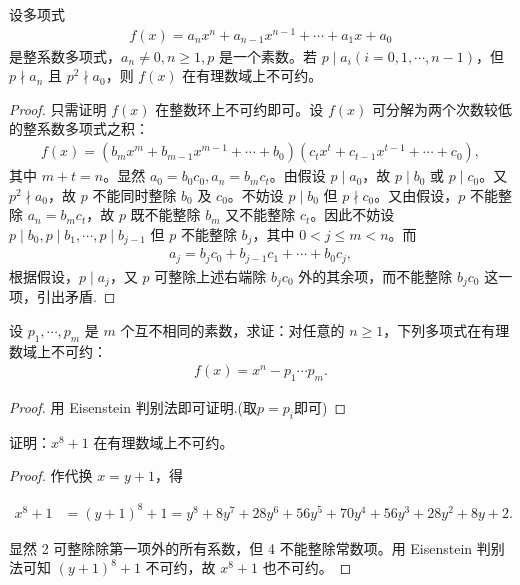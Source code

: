 \documentclass[../../main.tex]{subfiles}%
\begin{document}
\begin{theorem}[Eisenstein判别法]\label{theorem:Eisenstein判别法}
设多项式
\begin{align*}
f(x) = a_n x^n + a_{n-1} x^{n-1} + \cdots + a_1 x + a_0
\end{align*}
是整系数多项式，$a_n \neq 0, n \geqslant  1, p$ 是一个素数。若 $p \mid a_i (i = 0, 1, \cdots, n-1)$，但 $p \nmid a_n$ 且 $p^2 \nmid a_0$，则 $f(x)$ 在有理数域上不可约。    
\end{theorem}
\begin{proof}
只需证明 $f(x)$ 在整数环上不可约即可。设 $f(x)$ 可分解为两个次数较低的整系数多项式之积：
\begin{align*}
f(x) = (b_m x^m + b_{m-1} x^{m-1} + \cdots + b_0)(c_t x^t + c_{t-1} x^{t-1} + \cdots + c_0),
\end{align*}
其中 $m + t = n$。显然 $a_0 = b_0 c_0, a_n = b_m c_t$。由假设 $p \mid a_0$，故 $p \mid b_0$ 或 $p \mid c_0$。又 $p^2 \nmid a_0$，故 $p$ 不能同时整除 $b_0$ 及 $c_0$。不妨设 $p \mid b_0$ 但 $p \nmid c_0$。又由假设，$p$ 不能整除 $a_n = b_m c_t$，故 $p$ 既不能整除 $b_m$ 又不能整除 $c_t$。因此不妨设 $p \mid b_0, p \mid b_1, \cdots, p \mid b_{j-1}$ 但 $p$ 不能整除 $b_j$，其中 $0 < j \leqslant  m < n$。而
\begin{align*}
a_j = b_j c_0 + b_{j-1} c_1 + \cdots + b_0 c_j,
\end{align*}
根据假设，$p \mid a_j$，又 $p$ 可整除上述右端除 $b_j c_0$ 外的其余项，而不能整除 $b_j c_0$ 这一项，引出矛盾.
\end{proof}

\begin{example}
设 $p_1, \cdots, p_m$ 是 $m$ 个互不相同的素数，求证：对任意的 $n \geqslant  1$，下列多项式在有理数域上不可约：
\begin{align*}
f(x) = x^n - p_1 \cdots p_m.
\end{align*} 
\end{example}
\begin{proof}
用 Eisenstein 判别法即可证明.(取$p=p_i$即可)
\end{proof}

\begin{example}
证明：$x^8 + 1$ 在有理数域上不可约。
\end{example}
\begin{proof}
作代换 $x = y + 1$，得

\begin{align*}
x^8 + 1 &= (y + 1)^8 + 1 = y^8 + 8y^7 + 28y^6 + 56y^5 + 70y^4 + 56y^3 + 28y^2 + 8y + 2.
\end{align*}

显然 2 可整除除第一项外的所有系数，但 4 不能整除常数项。用 Eisenstein 判别法可知 $(y + 1)^8 + 1$ 不可约，故 $x^8 + 1$ 也不可约。
\end{proof}
\end{document}
